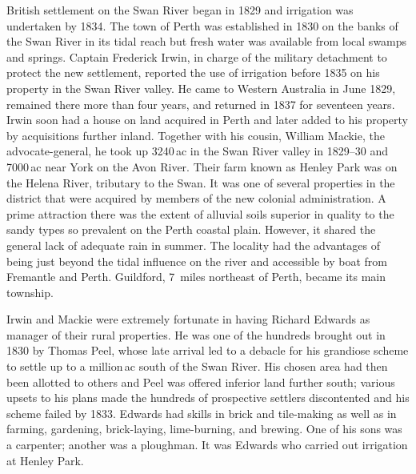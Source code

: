 British settlement on the Swan River began in 1829 and irrigation was
undertaken by 1834.  The town of Perth was established in 1830 on the
banks of the Swan River in its tidal reach but fresh water was
available from local swamps and springs.  Captain Frederick Irwin, in
charge of the military detachment to protect the new settlement,
reported the use of irrigation before 1835 on his property in the Swan
River valley.  He came to Western Australia in June 1829, remained
there more than four years, and returned in 1837 for seventeen years.
Irwin soon had a house on land acquired in Perth and later added to
his property by acquisitions further inland.  Together with his
cousin, William Mackie, the advocate-general, he took up 3240\,ac in
the Swan River valley in 1829--30 and 7000\,ac near York on the Avon
River.  Their farm known as Henley Park was on the Helena River,
tributary to the Swan.  It was one of several properties in the
district that were acquired by members of the new colonial
administration.  A prime attraction there was the extent of alluvial
soils superior in quality to the sandy types so prevalent on the Perth
coastal plain.  However, it shared the general lack of adequate rain
in summer.  The locality had the advantages of being just beyond the
tidal influence on the river and accessible by boat from Fremantle and
Perth.  Guildford, 7~miles northeast of Perth, became its main
township.

Irwin and Mackie were extremely fortunate in having Richard Edwards as
manager of their rural properties.  He was one of the hundreds brought
out in 1830 by Thomas Peel, whose late arrival led to a debacle for
his grandiose scheme to settle up to a million\,ac south of the Swan
River.  His chosen area had then been allotted to others and Peel was
offered inferior land further south; various upsets to his plans made
the hundreds of prospective settlers discontented and his scheme
failed by 1833.  Edwards had skills in brick and tile-making as well
as in farming, gardening, brick-laying, lime-burning, and brewing.
One of his sons was a carpenter; another was a ploughman.  It was
Edwards who carried out irrigation at Henley Park.

